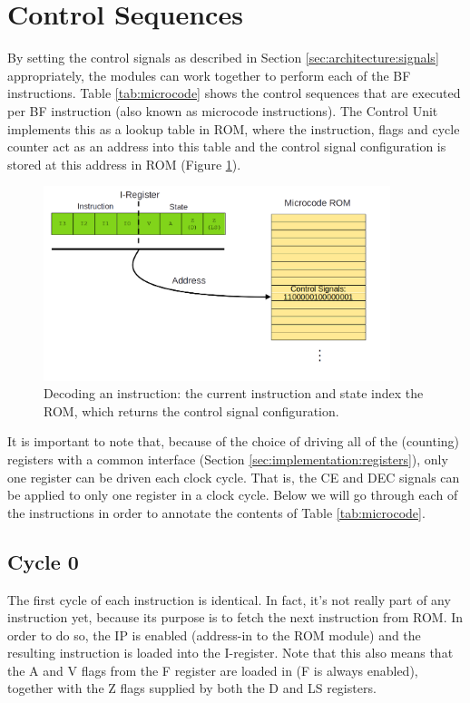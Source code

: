 \section{Control Sequences} \label{sec:sequences}
By setting the control signals as described in Section \ref{sec:architecture:signals} appropriately, the modules can work together to perform each of the BF instructions. Table \ref{tab:microcode} shows the control sequences that are executed per BF instruction (also known as microcode instructions). The Control Unit implements this as a lookup table in ROM, where the instruction, flags and cycle counter act as an address into this table and the control signal configuration is stored at this address in ROM (Figure \ref{fig:decoder}).

\begin{figure}[H]
  \centering
  \includegraphics[width=0.9\textwidth]{img/instruction_decoding}
  \caption{Decoding an instruction: the current instruction and state index the ROM, which returns the control signal configuration.}
  \label{fig:decoder}
\end{figure}

It is important to note that, because of the choice of driving all of the (counting) registers with a common interface (Section \ref{sec:implementation:registers}), only one register can be driven each clock cycle. That is, the CE and DEC signals can be applied to only one register in a clock cycle. Below we will go through each of the instructions in order to annotate the contents of Table \ref{tab:microcode}.


\subsection{Cycle 0}
The first cycle of each instruction is identical. In fact, it's not really part of any instruction yet, because its purpose is to fetch the next instruction from ROM. In order to do so, the IP is enabled (address-in to the ROM module) and the resulting instruction is loaded into the I-register. Note that this also means that the A and V flags from the F register are loaded in (F is always enabled), together with the Z flags supplied by both the D and LS registers.

